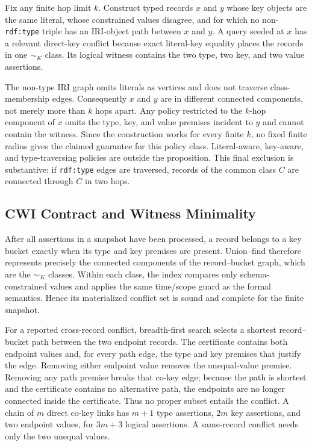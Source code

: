 \documentclass[letterpaper]{article}
\newcommand{\cwi}{\textsc{CWI}}
\begin{document}
Fix any finite hop limit $k$.  Construct typed records $x$ and $y$ whose key
objects are the same literal, whose constrained values disagree, and for which
no non-\texttt{rdf:type} triple has an IRI-object path between $x$ and $y$.
A query seeded at $x$ has a relevant direct-key conflict because exact
literal-key equality places the records in one $\sim_K$ class.  Its logical
witness contains the two type, two key, and two value assertions.

The non-type IRI graph omits literals as vertices and does not traverse
class-membership edges.  Consequently $x$ and $y$ are in different connected
components, not merely more than $k$ hops apart.  Any policy restricted to the
$k$-hop component of $x$ omits the type, key, and value premises incident to
$y$ and cannot contain the witness.  Since the construction works for every
finite $k$, no fixed finite radius gives the claimed guarantee for this policy
class.  Literal-aware, key-aware, and type-traversing policies are outside the
proposition.  This final exclusion is substantive: if \texttt{rdf:type} edges
are traversed, records of the common class $C$ are connected through $C$ in
two hops.

\subsection{\cwi{} Contract and Witness Minimality}

After all assertions in a snapshot have been processed, a record belongs to a
key bucket exactly when its type and key premises are present.  Union--find
therefore represents precisely the connected components of the record--bucket
graph, which are the $\sim_K$ classes.  Within each class, the index compares
only schema-constrained values and applies the same time/scope guard as the
formal semantics.  Hence its materialized conflict set is sound and complete
for the finite snapshot.

For a reported cross-record conflict, breadth-first search selects a shortest
record--bucket path between the two endpoint records.  The certificate contains
both endpoint values and, for every path edge, the type and key premises that
justify the edge.  Removing either endpoint value removes the unequal-value
premise.  Removing any path premise breaks that co-key edge; because the path
is shortest and the certificate contains no alternative path, the endpoints
are no longer connected inside the certificate.  Thus no proper subset
entails the conflict.  A chain of $m$ direct co-key links has $m+1$ type
assertions, $2m$ key assertions, and two endpoint values, for $3m+3$ logical
assertions.  A same-record conflict needs only the two unequal values.
\end{document}
